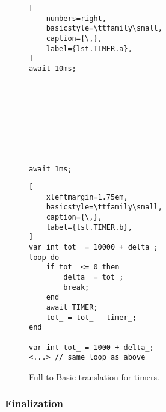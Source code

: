 \begin{figure}[!ht]
\begin{minipage}[t]{0.33\linewidth}
\begin{lstlisting}[
    numbers=right,
    basicstyle=\ttfamily\small,
    caption={\,},
    label={lst.TIMER.a},
]
await 10ms;









await 1ms;

\end{lstlisting}
\end{minipage}
%
\begin{minipage}[t]{0.63\linewidth}
\begin{lstlisting}[
    xleftmargin=1.75em,
    basicstyle=\ttfamily\small,
    caption={\,},
    label={lst.TIMER.b},
]
var int tot_ = 10000 + delta_;
loop do
    if tot_ <= 0 then
        delta_ = tot_;
        break;
    end
    await TIMER;
    tot_ = tot_ - timer_;
end

var int tot_ = 1000 + delta_;
<...> // same loop as above
\end{lstlisting}
\end{minipage}
\caption{ Full-to-Basic translation for timers. }
\label{lst.TIMER}
\end{figure}

\subsubsection{Finalization}


